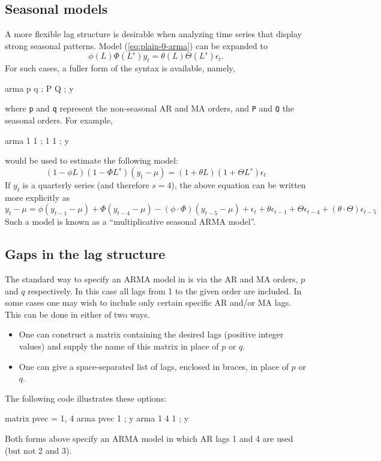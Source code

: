 \subsection{Seasonal models}

A more flexible lag structure is desirable when analyzing time series
that display strong seasonal patterns. Model (\ref{eq:plain-0-arma})
can be expanded to
\begin{equation}
  \label{eq:seasonal-arma}
  \phi(L) \Phi(L^s) y_t = \theta(L) \Theta(L^s) \epsilon_t .
\end{equation}
For such cases, a fuller form of the syntax is available, namely,
\begin{code}
arma p q ; P Q ; y
\end{code}
where \texttt{p} and \texttt{q} represent the non-seasonal AR and MA
orders, and \texttt{P} and \texttt{Q} the seasonal orders.  For
example,
\begin{code}
arma 1 1 ; 1 1 ; y
\end{code}
would be used to estimate the following model:
\[
  (1 -\phi L)(1 -\Phi L^s) (y_t - \mu) = (1 + \theta L)(1 + \Theta L^s) \epsilon_t
\]
If $y_t$ is a quarterly series (and therefore $s=4$), the above
equation can be written more explicitly as
\[
y_t - \mu = \phi (y_{t-1} - \mu) + \Phi (y_{t-4} - \mu) - (\phi
  \cdot \Phi) (y_{t-5} - \mu) + \epsilon_t + \theta \epsilon_{t-1} + \Theta
  \epsilon_{t-4} + (\theta \cdot \Theta) \epsilon_{t-5}
\]
Such a model is known as a ``multiplicative seasonal ARMA model''.


\subsection{Gaps in the lag structure}

The standard way to specify an ARMA model in  is via the AR
and MA orders, $p$ and $q$ respectively.  In this case all lags from 1
to the given order are included.  In some cases one may wish to
include only certain specific AR and/or MA lags.  This can be done in
either of two ways.
%
\begin{itemize}
\item One can construct a matrix containing the desired lags (positive
  integer values) and supply the name of this matrix in place of $p$
  or $q$.
\item One can give a space-separated list of lags, enclosed in braces,
  in place of $p$ or $q$.
\end{itemize}
%
The following code illustrates these options:
%
\begin{code}
matrix pvec = {1, 4}
arma pvec 1 ; y
arma {1 4} 1 ; y
\end{code}
%
Both forms above specify an ARMA model in which AR lags 1 and 4 are
used (but not 2 and 3). 


